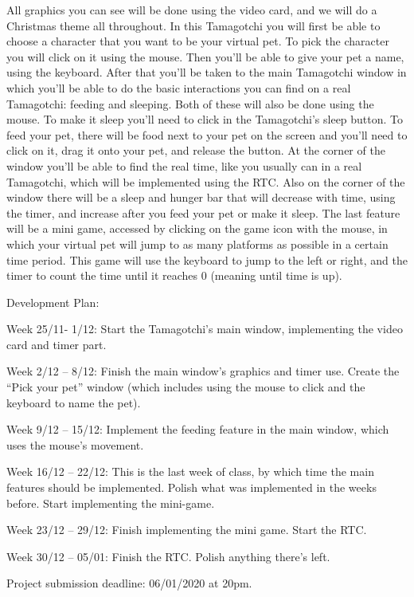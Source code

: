 All graphics you can see will be done using the video card, and we will do a Christmas theme all throughout. In this Tamagotchi you will first be able to choose a character that you want to be your virtual pet. To pick the character you will click on it using the mouse. Then you’ll be able to give your pet a name, using the keyboard. After that you’ll be taken to the main Tamagotchi window in which you’ll be able to do the basic interactions you can find on a real Tamagotchi\+: feeding and sleeping. Both of these will also be done using the mouse. To make it sleep you’ll need to click in the Tamagotchi’s sleep button. To feed your pet, there will be food next to your pet on the screen and you’ll need to click on it, drag it onto your pet, and release the button. At the corner of the window you’ll be able to find the real time, like you usually can in a real Tamagotchi, which will be implemented using the R\+TC. Also on the corner of the window there will be a sleep and hunger bar that will decrease with time, using the timer, and increase after you feed your pet or make it sleep. The last feature will be a mini game, accessed by clicking on the game icon with the mouse, in which your virtual pet will jump to as many platforms as possible in a certain time period. This game will use the keyboard to jump to the left or right, and the timer to count the time until it reaches 0 (meaning until time is up).

Development Plan\+:

Week 25/11-\/ 1/12\+: Start the Tamagotchi’s main window, implementing the video card and timer part.

Week 2/12 – 8/12\+: Finish the main window’s graphics and timer use. Create the “\+Pick your pet” window (which includes using the mouse to click and the keyboard to name the pet).

Week 9/12 – 15/12\+: Implement the feeding feature in the main window, which uses the mouse’s movement.

Week 16/12 – 22/12\+: This is the last week of class, by which time the main features should be implemented. Polish what was implemented in the weeks before. Start implementing the mini-\/game.

Week 23/12 – 29/12\+: Finish implementing the mini game. Start the R\+TC.

Week 30/12 – 05/01\+: Finish the R\+TC. Polish anything there’s left.

Project submission deadline\+: 06/01/2020 at 20pm. 